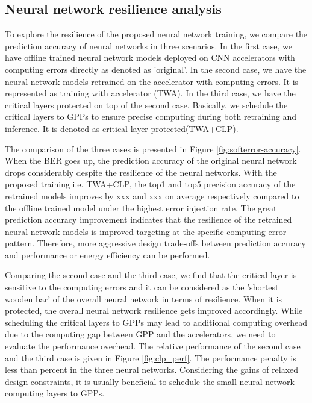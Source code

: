 \subsection{Neural network resilience analysis}
To explore the resilience of the proposed neural network training, we
compare the prediction accuracy of neural networks in three scenarios.
In the first case, we have offline trained neural network models deployed on 
CNN accelerators with computing errors directly as denoted as 'original'.
In the second case, we have the neural network models retrained on the 
accelerator with computing errors. It is represented as training with 
accelerator (TWA). In the third case, we have the critical layers 
protected on top of the second case. Basically, we schedule the critical layers to 
GPPs to ensure precise computing during both retraining and inference.
It is denoted as critical layer protected(TWA+CLP).

The comparison of the three cases is presented in Figure \ref{fig:softerror-accuracy}.
When the BER goes up, the prediction accuracy of the original neural network drops 
considerably despite the resilience of the neural networks. 
With the proposed training i.e. TWA+CLP, the top1 and top5 precision accuracy 
of the retrained models improves by xxx and xxx on average respectively 
compared to the offline trained model under the highest error injection rate. 
The great prediction accuracy improvement indicates that the resilience 
of the retrained neural network models is improved targeting at the 
specific computing error pattern. Therefore, more aggressive design trade-offs 
between prediction accuracy and performance or energy efficiency can be performed. 

Comparing the second case and the third case, we find that the critical layer 
is sensitive to the computing errors and it can be considered as the 'shortest 
wooden bar' of the overall neural network in terms of resilience. When it is protected, 
the overall neural network resilience gets improved accordingly.
While scheduling the critical layers to GPPs may lead to additional computing overhead 
due to the computing gap between GPP and the accelerators, we need to evaluate the 
performance overhead. The relative performance of the second case and the third case 
is given in Figure \ref{fig:clp_perf}. The performance penalty is less than percent 
in the three neural networks. Considering the gains of relaxed design constraints, 
it is usually beneficial to schedule the small neural network computing layers to GPPs. 

